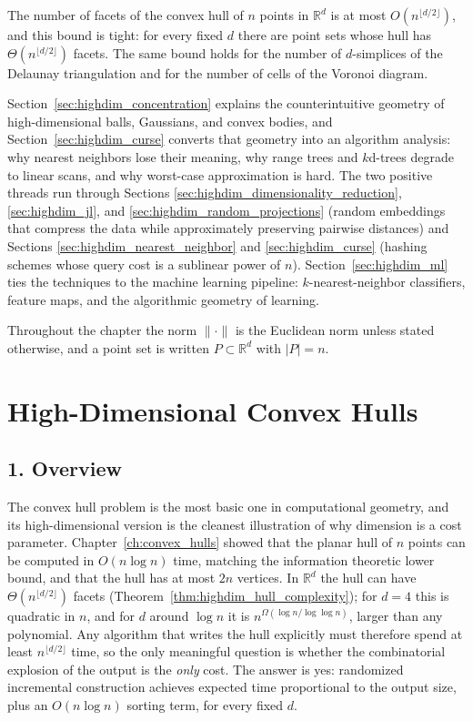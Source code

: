 \begin{theorem}
\label{thm:highdim_hull_complexity}
The number of facets of the convex hull of $n$ points in $\mathbb{R}^d$ is at
most $O(n^{\lfloor d/2 \rfloor})$, and this bound is tight: for every fixed
$d$ there are point sets whose hull has
$\Theta(n^{\lfloor d/2 \rfloor})$ facets. The same bound holds for the number
of $d$-simplices of the Delaunay triangulation and for the number of cells of
the Voronoi diagram.
\end{theorem}

Section~\ref{sec:highdim_concentration} explains the counterintuitive
geometry of high-dimensional balls, Gaussians, and convex bodies, and
Section~\ref{sec:highdim_curse} converts that geometry into an algorithm
analysis: why nearest neighbors lose their meaning, why range trees and
$k$d-trees degrade to linear scans, and why worst-case approximation is hard.
The two positive threads run through Sections
\ref{sec:highdim_dimensionality_reduction}, \ref{sec:highdim_jl}, and
\ref{sec:highdim_random_projections} (random embeddings that compress the data
while approximately preserving pairwise distances) and Sections
\ref{sec:highdim_nearest_neighbor} and \ref{sec:highdim_curse} (hashing schemes
whose query cost is a sublinear power of $n$). Section~\ref{sec:highdim_ml}
ties the techniques to the machine learning pipeline: $k$-nearest-neighbor
classifiers, feature maps, and the algorithmic geometry of learning.

Throughout the chapter the norm $\|\cdot\|$ is the Euclidean norm unless stated
otherwise, and a point set is written $P \subset \mathbb{R}^d$ with
$|P| = n$.


\section{High-Dimensional Convex Hulls}
\label{sec:highdim_hulls}

\subsection{1. Overview}

The convex hull problem is the most basic one in computational geometry, and
its high-dimensional version is the cleanest illustration of why dimension is
a cost parameter. Chapter~\ref{ch:convex_hulls} showed that the planar hull of
$n$ points can be computed in $O(n \log n)$ time, matching the information
theoretic lower bound, and that the hull has at most $2n$ vertices. In
$\mathbb{R}^d$ the hull can have $\Theta(n^{\lfloor d/2 \rfloor})$ facets
(Theorem~\ref{thm:highdim_hull_complexity}); for $d = 4$ this is quadratic in
$n$, and for $d$ around $\log n$ it is $n^{\Omega(\log n / \log\log n)}$,
larger than any polynomial. Any algorithm that writes the hull explicitly must
therefore spend at least $n^{\lfloor d/2 \rfloor}$ time, so the only
meaningful question is whether the combinatorial explosion of the output is
the \emph{only} cost. The answer is yes: randomized incremental construction
achieves expected time proportional to the output size, plus an $O(n \log n)$
sorting term, for every fixed $d$.


